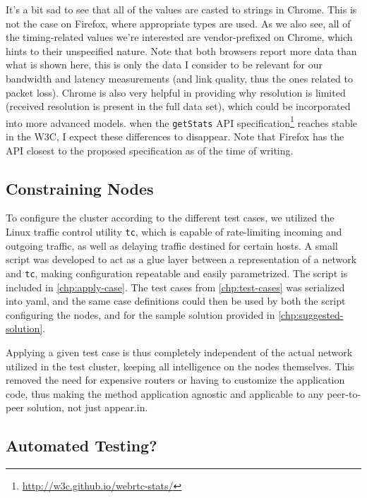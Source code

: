 It's a bit sad to see that all of the values are casted to strings in Chrome. This is not the case on Firefox, where appropriate types are used. As we also see, all of the timing-related values we're interested are vendor-prefixed on Chrome, which hints to their unspecified nature. Note that both browsers report more data than what is shown here, this is only the data I consider to be relevant for our bandwidth and latency measurements (and link quality, thus the ones related to packet loss). Chrome is also very helpful in providing why resolution is limited (received resolution is present in the full data set), which could be incorporated into more advanced models. when the \texttt{getStats} API specification\footnote{\url{http://w3c.github.io/webrtc-stats/}} reaches stable in the W3C, I expect these differences to disappear. Note that Firefox has the API closest to the proposed specification as of the time of writing.


\subsection{Constraining Nodes}

To configure the cluster according to the different test cases, we utilized the Linux traffic control utility \texttt{tc}, which is capable of rate-limiting incoming and outgoing traffic, as well as delaying traffic destined for certain hosts. A small script was developed to act as a glue layer between a representation of a network and \texttt{tc}, making configuration repeatable and easily parametrized. The script is included in \autoref{chp:apply-case}. The test cases from \autoref{chp:test-cases} was serialized into \gls{yaml}, and the same case definitions could then be used by both the script configuring the nodes, and for the sample solution provided in \autoref{chp:suggested-solution}.

Applying a given test case is thus completely independent of the actual network utilized in the test cluster, keeping all intelligence on the nodes themselves. This removed the need for expensive routers or having to customize the application code, thus making the method application agnostic and applicable to any peer-to-peer solution, not just appear.in.


\subsection{Automated Testing?}\label{subsec:automated-testing}

